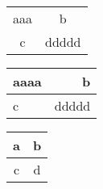 \documentclass{article}
\begin{document}
  \begin{tabular}{|c|c|}
    aaa & b \\
    c & ddddd\\
  \end{tabular}

  \begin{tabular}{|l|r|}
    \hline
    aaaa & b \\
    \hline
    c & ddddd\\
    \hline
  \end{tabular}

  \begin{center}
    \begin{tabular}{|c|c|}
      \hline
      a & b \\ \hline
      c & d\\
      \hline
    \end{tabular}
  \end{center}
\end{document}
